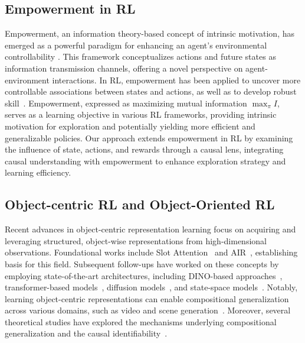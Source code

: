 \subsection{Empowerment in RL}
\vspace{-2mm}
Empowerment, an information theory-based concept of intrinsic motivation, has emerged as a powerful paradigm for enhancing an agent's environmental controllability \citep{mohamed2015variational,klyubin2005empowerment,cao2024towards}. This framework conceptualizes actions and future states as information transmission channels, offering a novel perspective on agent-environment interactions. 
In RL, empowerment has been applied to uncover more controllable associations between states and actions, as well as to develop robust skill~\citep{salge2014empowerment,bharadhwaj2022information,choi2021variational, eysenbach2018diversity,leibfried2019unified,seitzer2021causal}. Empowerment, expressed as maximizing mutual information $\max_{\pi} I$, serves as a learning objective in various RL frameworks, providing intrinsic motivation for exploration and potentially yielding more efficient and generalizable policies. Our approach extends empowerment in RL by examining the influence of state, actions, and rewards through a causal lens, integrating causal understanding with empowerment to enhance exploration strategy and learning efficiency.
\vspace{-3mm}


\vspace{-1mm}
\subsection{Object-centric RL and Object-Oriented RL}
\vspace{-2mm}
Recent advances in object-centric representation learning focus on acquiring and leveraging structured, object-wise representations from high-dimensional observations. Foundational works include Slot Attention~\citep{locatello2020object} and AIR~\citep{eslami2016attend, kosiorek2018sequential}, establishing basis for this field. Subsequent follow-ups have worked on these concepts by employing state-of-the-art architectures, including DINO-based approaches~\cite{zadaianchuk2023objectcentric}, transformer-based models~\citep{wu2022slotformer}, diffusion models~\citep{jiang2023object}, and state-space models~\citep{jiang2024slot}. Notably, learning object-centric representations can enable compositional generalization across various domains, such as video and scene generation~\citep{wu2023slotdiffusion, wu2024neural}. Moreover, several theoretical studies have explored the mechanisms underlying compositional generalization and the causal identifiability~\citep{kori2024identifiable, brady2023provably, lachapelle2024additive}.

